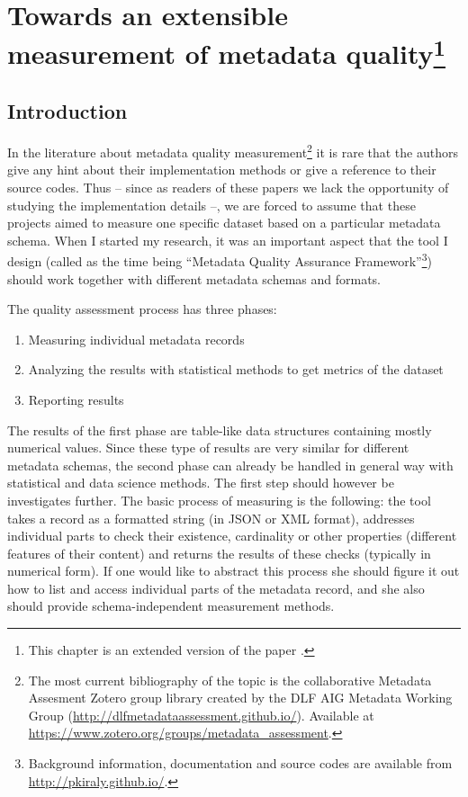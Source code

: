 \chapter[Towards an extensible measurement of metadata quality]{Towards an extensible measurement of metadata quality\footnote{This chapter is an extended version of the paper \cite{kiraly2017}.}}

\section{Introduction}

In the literature about metadata quality measurement\footnote{The most current bibliography of the topic is the collaborative Metadata Assesment Zotero group library created by the DLF AIG Metadata Working Group (\url{http://dlfmetadataassessment.github.io/}). Available at \url{https://www.zotero.org/groups/metadata_assessment}.} it is rare that the authors give any hint about their implementation methods or give a reference to their source codes. 
Thus -- since as readers of these papers we lack the opportunity of studying the implementation details --, we are forced to assume that these projects aimed to measure one specific dataset based on a particular metadata schema. When I started my research, it was an important aspect that the tool I design (called as the time being ``Metadata Quality Assurance Framework''\footnote{Background information, documentation and source codes are available from \url{http://pkiraly.github.io/}.}) should work together with different metadata schemas and formats.

The quality assessment process has three phases:

\begin{enumerate}
\item Measuring individual metadata records
\item Analyzing the results with statistical methods to get metrics of the dataset
\item Reporting results
\end{enumerate}

The results of the first phase are table-like data structures containing mostly numerical values. Since these type of results are very similar for different metadata schemas, the second phase can already be handled in general way with statistical and data science methods. The first step should however be investigates further. The basic process of measuring is the following: the tool takes a record as a formatted string (in JSON or XML format), addresses individual parts to check their existence, cardinality or other properties (different features of their content) and returns the results of these checks (typically in numerical form). If one would like to abstract this process she should figure it out how to list and access individual parts of the metadata record, and she also should provide schema-independent measurement methods.

